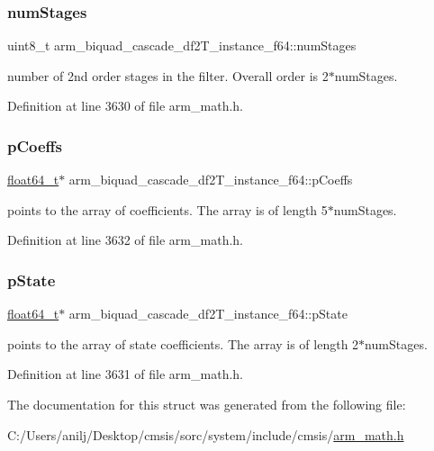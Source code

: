 \subsubsection{\texorpdfstring{num\+Stages}{numStages}}
{\footnotesize\ttfamily uint8\+\_\+t arm\+\_\+biquad\+\_\+cascade\+\_\+df2\+T\+\_\+instance\+\_\+f64\+::num\+Stages}

number of 2nd order stages in the filter. Overall order is 2$\ast$num\+Stages. 

Definition at line 3630 of file arm\+\_\+math.\+h.

\mbox{\label{structarm__biquad__cascade__df2_t__instance__f64_ae2f0180f9038c0393e1d6921bb3b878b}} 
\subsubsection{\texorpdfstring{p\+Coeffs}{pCoeffs}}
{\footnotesize\ttfamily \hyperlink{arm__math_8h_ac55f3ae81b5bc9053760baacf57e47f4}{float64\+\_\+t}$\ast$ arm\+\_\+biquad\+\_\+cascade\+\_\+df2\+T\+\_\+instance\+\_\+f64\+::p\+Coeffs}

points to the array of coefficients. The array is of length 5$\ast$num\+Stages. 

Definition at line 3632 of file arm\+\_\+math.\+h.

\mbox{\label{structarm__biquad__cascade__df2_t__instance__f64_a0bde57b618e3f9059b23b0de64e12ce3}} 
\subsubsection{\texorpdfstring{p\+State}{pState}}
{\footnotesize\ttfamily \hyperlink{arm__math_8h_ac55f3ae81b5bc9053760baacf57e47f4}{float64\+\_\+t}$\ast$ arm\+\_\+biquad\+\_\+cascade\+\_\+df2\+T\+\_\+instance\+\_\+f64\+::p\+State}

points to the array of state coefficients. The array is of length 2$\ast$num\+Stages. 

Definition at line 3631 of file arm\+\_\+math.\+h.



The documentation for this struct was generated from the following file\+:\begin{DoxyCompactItemize}
\item 
C\+:/\+Users/anilj/\+Desktop/cmsis/sorc/system/include/cmsis/\hyperlink{arm__math_8h}{arm\+\_\+math.\+h}\end{DoxyCompactItemize}

